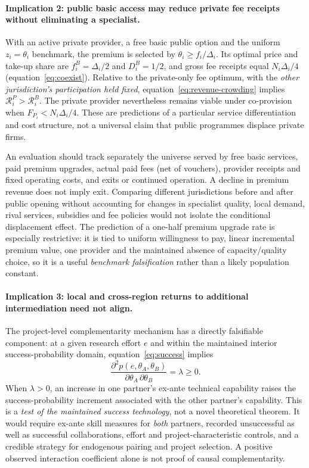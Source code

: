 \paragraph{Implication 2: public basic access may reduce private fee receipts without eliminating a specialist.}
With an active private provider, a free basic public option and the uniform $z_i=\theta_i$ benchmark, the premium is selected by $\theta_i\geq f_i/\Delta_i$. Its optimal price and take-up share are $f_i^B=\Delta_i/2$ and $D_i^B=1/2$, and gross fee receipts equal $N_i\Delta_i/4$ (equation~\eqref{eq:coexist}). Relative to the private-only fee optimum, with the \emph{other jurisdiction's participation held fixed}, equation~\eqref{eq:revenue-crowding} implies $\mathcal R_i^P>\mathcal R_i^B$. The private provider nevertheless remains viable under co-provision when $F_{P_i}<N_i\Delta_i/4$. These are predictions of a particular service differentiation and cost structure, not a universal claim that public programmes displace private firms.

An evaluation should track separately the universe served by free basic services, paid premium upgrades, actual paid fees (net of vouchers), provider receipts and fixed operating costs, and exits or continued operation. A decline in premium revenue does not imply exit. Comparing different jurisdictions before and after public opening without accounting for changes in specialist quality, local demand, rival services, subsidies and fee policies would not isolate the conditional displacement effect. The prediction of a one-half premium upgrade rate is especially restrictive: it is tied to uniform willingness to pay, linear incremental premium value, one provider and the maintained absence of capacity/quality choice, so it is a useful \emph{benchmark falsification} rather than a likely population constant.

\paragraph{Implication 3: local and cross-region returns to additional intermediation need not align.}
The project-level complementarity mechanism has a directly falsifiable component: at a given research effort $e$ and within the maintained interior success-probability domain, equation~\eqref{eq:success} implies
\begin{equation}
 \frac{\partial^2 p(e,\theta_A,\theta_B)}
 {\partial\theta_A\,\partial\theta_B}=\lambda\geq0.
 \label{eq:empirical-skill-complementarity}
\end{equation}
When $\lambda>0$, an increase in one partner's ex-ante technical capability raises the success-probability increment associated with the other partner's capability. This is a \emph{test of the maintained success technology}, not a novel theoretical theorem. It would require ex-ante skill measures for \emph{both} partners, recorded unsuccessful as well as successful collaborations, effort and project-characteristic controls, and a credible strategy for endogenous pairing and project selection. A positive observed interaction coefficient alone is not proof of causal complementarity.


